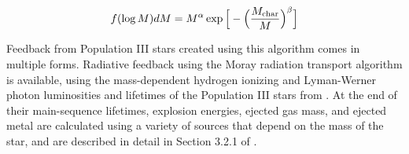 \begin{equation}
f(\log M) dM = M^{\alpha} \exp \Big[ -\Big( \frac{M_{\rm char}}{M}
\Big)^{\beta} \Big]
\end{equation}

Feedback from Population III stars created using this algorithm comes in multiple forms.
Radiative feedback using the Moray radiation transport algorithm
\citep{Wise11_Moray} is available, using the mass-dependent hydrogen
ionizing and Lyman-Werner photon luminosities and lifetimes of the
Population III stars from \citet{2002A&A...382...28S}.  At the end of
their main-sequence lifetimes, explosion energies, ejected gas mass,
and ejected metal are calculated using a variety of sources that
depend on the mass of the star, and are described in detail in Section
3.2.1 of \citet{2012MNRAS.427..311W}.


